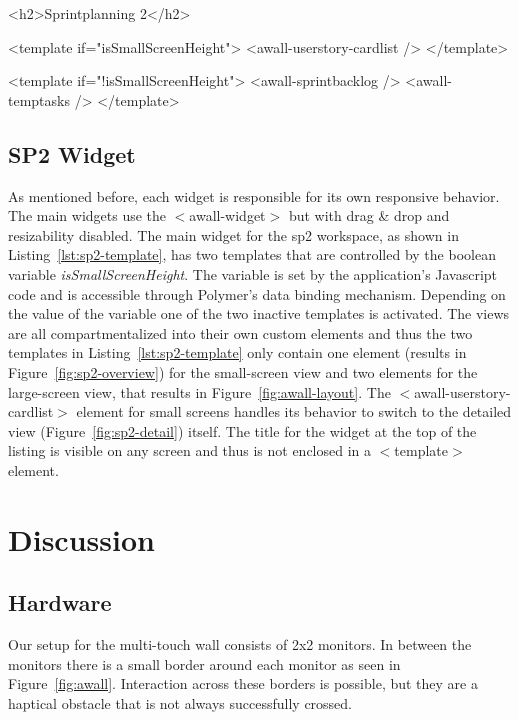 \documentclass{sigchi}
\begin{document}
\begin{code}[caption={How the \gls{sp2} main widget decides which view to show.},label=lst:sp2-template]
<h2>Sprintplanning 2</h2>
	
<template if="{{isSmallScreenHeight}}">
  <awall-userstory-cardlist />
</template>
	
<template if="{{!isSmallScreenHeight}}">
  <awall-sprintbacklog />
  <awall-temptasks />
</template>
\end{code}

\subsection{SP2 Widget}
As mentioned before, each widget is responsible for its own responsive behavior.
The main widgets use the $<$awall-widget$>$ but with drag \& drop and resizability disabled.
The main widget for the \gls{sp2} workspace, as shown in Listing~\ref{lst:sp2-template}, has two templates that are controlled by the boolean variable \textit{isSmallScreenHeight}.
The variable is set by the application's Javascript code and is accessible through Polymer's data binding mechanism.
Depending on the value of the variable one of the two inactive templates is activated.
The views are all compartmentalized into their own custom elements and thus the two templates in Listing~\ref{lst:sp2-template} only contain one element (results in Figure~\ref{fig:sp2-overview}) for the small-screen view and two elements for the large-screen view, that results in Figure~\ref{fig:awall-layout}.
The $<$awall-userstory-cardlist$>$ element for small screens handles its behavior to switch to the detailed view (Figure~\ref{fig:sp2-detail}) itself.
The title for the widget at the top of the listing is visible on any screen and thus is not enclosed in a $<$template$>$ element.


\section{Discussion}

\subsection{Hardware}
Our setup for the multi-touch wall consists of 2x2 monitors.
In between the monitors there is a small border around each monitor as seen in Figure~\ref{fig:awall}.
Interaction across these borders is possible, but they are a haptical obstacle that is not always successfully crossed.
\end{document}
